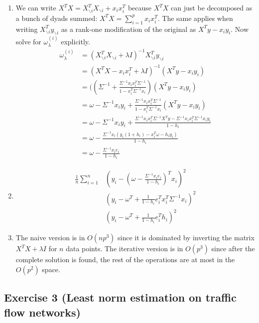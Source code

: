 \documentclass[11pt]{article}
\begin{document}
\begin{solution}
\begin{enumerate}
  \item We can write $X^T X = X_{\backslash i}^T X_{\backslash i} + x_i x_i^T$ because $X^T X$ can just be decomposed as a bunch of dyads summed: $X^T X = \sum_{i=1}^p x_i x_i^T$. The same applies when writing $X_{\backslash i}^T y_{\backslash i}$ as a rank-one modification of the original as $X^T y - x_i y_i$. Now solve for $\omega_{\lambda}^{(i)}$ explicitly.
  \begin{align*}
    \omega_{\lambda}^{(i)} &= (X_{\backslash i}^T X_{\backslash i} + \lambda I)^{-1} X_{\backslash i}^T y_{\backslash i} \\
    &= (X^T X - x_i x_i^T + \lambda I)^{-1} (X^T y - x_i y_i) \\
    &= ((\Sigma^{-1} + \frac{\Sigma^{-1} x_i x_i^T \Sigma^{-1}}{1 - x_i^T \Sigma^{-1} x_i}) (X^T y - x_i y_i) \\
    &= \omega - \Sigma^{-1} x_i y_i + \frac{\Sigma^{-1} x_i x_i^T \Sigma^{-1}}{1 - x_i^T \Sigma^{-1} x_i} (X^T y - x_i y_i) \\
    &= \omega - \Sigma^{-1} x_i y_i + \frac{\Sigma^{-1} x_i x_i^T \Sigma^{-1} X^T y - \Sigma^{-1} x_i x_i^T \Sigma^{-1} x_i y_i}{1 - h_i} \\
    &= \omega - \frac{\Sigma^{-1} x_i (y_i(1 + h_i) - x_i^T \omega - h_i y_i)}{1 - h_i} \\
    &= \omega - \frac{\Sigma^{-1} x_i e_i}{1 - h_i}
  \end{align*}

  \item \begin{align*}
      \frac{1}{n} \sum_{i=1}^n &(y_i - (\omega - \frac{\Sigma^{-1} x_i e_i}{1 - h_i})^T x_i)^2 \\
      &(y_i - \omega^T + \frac{1}{1 - h_i} e_i^T x_i^T \Sigma^{-1} x_i)^2 \\
      &(y_i - \omega^T + \frac{1}{1 - h_i} e_i^T h_i)^2
  \end{align*}

\item The naive version is in $O(n p^3)$ since it is dominated by inverting the matrix $X^T X + \lambda I$ for $n$ data points. The iterative version is in $O(p^3)$ since after the complete solution is found, the rest of the operations are at most in the $O(p^2)$ space.
  \end{enumerate}
\end{solution}

\newpage
\subsection*{Exercise 3 (Least norm estimation on traffic flow networks)}
\end{document}
